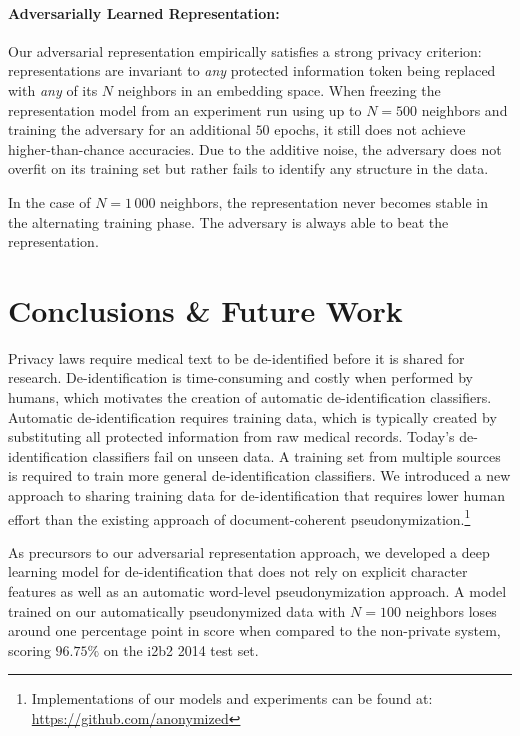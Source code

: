 \paragraph{Adversarially Learned Representation:}
%
Our adversarial representation empirically satisfies a strong privacy criterion: representations are invariant to \textit{any} protected information token being replaced with \textit{any} of its $N$ neighbors in an embedding space.
%
When freezing the representation model from an experiment run using up to $N = 500$ neighbors and training the adversary for an additional $50$ epochs, it still does not achieve higher-than-chance accuracies.
%
Due to the additive noise, the adversary does not overfit on its training set but rather fails to identify any structure in the data.

%
In the case of $N = 1\,000$ neighbors, the representation never becomes stable in the alternating training phase.
%
The adversary is always able to beat the representation.

\section{Conclusions \& Future Work}
%
Privacy laws require medical text to be de-identified before it is shared for research.
%
De-identifi\-ca\-tion is time-consuming and costly when performed by humans, which motivates the creation of automatic de-identification classifiers.
%
Automatic de-identification requires training data, which is typically created by substituting all protected information from raw medical records.
%
Today's de-identification classifiers fail on unseen data.
%
A training set from multiple sources is required to train more general de-identification classifiers.
%
We introduced a new approach to sharing training data for de-identification that requires lower human effort than the existing approach of document-coherent pseudonymization.\footnote{Implementations of our models and experiments can be found at: \url{https://github.com/anonymized}}

%
As precursors to our adversarial representation approach, we developed a deep learning model for de-identification that does not rely on explicit character features as well as an automatic word-level pseudonymization approach.
%
A model trained on our automatically pseudonymized data with $N=100$ neighbors loses around one percentage point in \fone score when compared to the non-private system, scoring $96.75\%$ on the i2b2 2014 test set.

